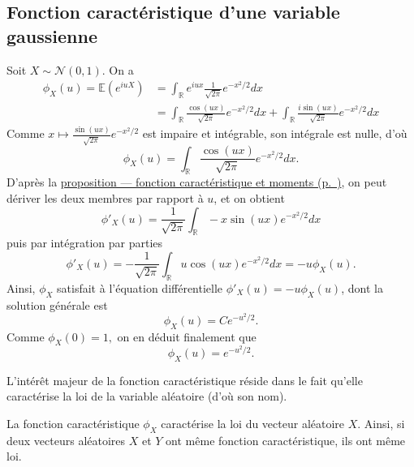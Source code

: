 \subsection*{Fonction caractéristique d'une variable
gaussienne}\label{IV-fctcaracgauss}

Soit \(X \sim \mathcal{N}(0,1)\). On a \begin{align*}
\phi_X(u) = \mathbb{E}(e^{iuX}) &= \int_\mathbb{R}e^{iux}\frac{1}{\sqrt{2\pi}}e^{-x^2/2}dx \\
                          &= \int_\mathbb{R}\frac{\cos(ux)}{\sqrt{2\pi}}e^{-x^2/2}dx + \int_\mathbb{R}\frac{i\sin(ux)}{\sqrt{2\pi}}e^{-x^2/2}dx
\end{align*} Comme \(x \mapsto \frac{\sin(ux)}{\sqrt{2\pi}}e^{-x^2/2}\)
est impaire et intégrable, son intégrale est nulle, d'où
\[\phi_X(u) = \int_\mathbb{R}\frac{\cos(ux)}{\sqrt{2\pi}}e^{-x^2/2}dx.\]
D'après la \protect\hyperref[IV-fct_carac_deriv]{proposition ---
fonction caractéristique et moments (p.~\pageref*{IV-fct_carac_deriv})},
on peut dériver les deux membres par rapport à \(u\), et on obtient
\[\phi'_X(u) = \frac{1}{\sqrt{2\pi}}\int_\mathbb{R}-x\sin(ux)e^{-x^2/2}dx\]
puis par intégration par parties
\[\phi'_X(u) = -\frac{1}{\sqrt{2\pi}}\int_\mathbb{R}u\cos(ux)e^{-x^2/2}dx = -u\phi_X(u).\]
Ainsi, \(\phi_X\) satisfait à l'équation différentielle
\(\phi'_X(u) = -u\phi_X(u)\), dont la solution générale est
\[\phi_X(u) = C e^{-u^2/2}.\] Comme \(\phi_X(0) = 1,\) on en déduit
finalement que \[\phi_X(u) = e^{-u^2/2}.\]

L'intérêt majeur de la fonction caractéristique réside dans le fait
qu'elle caractérise la loi de la variable aléatoire (d'où son nom).

\begin{theoreme}[{Caractérisation}]\label{IV-caracfc}

La fonction caractéristique \(\phi_X\) caractérise la loi du vecteur
aléatoire \(X\). Ainsi, si deux vecteurs aléatoires \(X\) et \(Y\) ont
même fonction caractéristique, ils ont même loi.
\end{theoreme}

